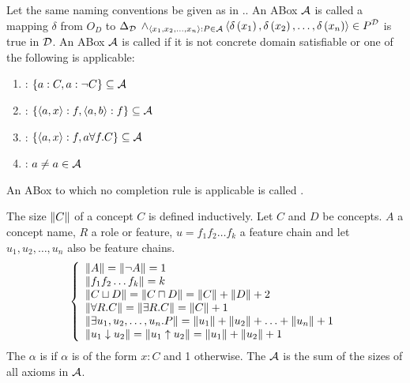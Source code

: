 \begin{defi}
Let the same naming conventions be given as in .. An ABox $\mathcal{A}$ is called  \iffTx{} \teTx{} a mapping $\delta$ from $O_D$ to $\Delta_{\mathcal{D}}$ \stTx{} $\displaystyle\wedge_{\left\langle x_1,x_2,\ldots,x_n\right\rangle:P\in\mathcal{A}}\left\langle \delta\left(x_1\right),\delta\left(x_2\right),\ldots,\delta\left(x_n\right)\right\rangle\in P^{\mathcal{D}}$ is true in $\mathcal{D}$. An ABox $\mathcal{A}$ is called  if it is not concrete domain satisfiable or one of the following  is applicable:
\begin{enumerate}
 \item {}: $\left\{ a:C,a:\neg C\right\}\subseteq\mathcal{A}$
 \item {}: $\left\{ \left\langle a,x\right\rangle:f,\left\langle a,b\right\rangle:f\right\}\subseteq\mathcal{A}$
 \item {}: $\left\{ \left\langle a,x\right\rangle:f,a\forall f.C\right\}\subseteq\mathcal{A}$
 \item {}: $a\neq a\in\mathcal{A}$
\end{enumerate}
An ABox to which no completion rule is applicable is called .
\cite{conf/ijcai/Lutz99}
\end{defi}

\begin{defi}
The size $\left\|C\right\|$ of a concept $C$ is defined inductively. Let $C$ and $D$ be concepts. $A$ a concept name, $R$ a role or feature, $u=f_1f_2\ldots f_k$ a feature chain and let $u_1,u_2,\ldots,u_n$ also be feature chains.
\begin{equation}
\left\{\begin{array}{l}\left\|A\right\|=\left\|\neg A\right\|=1\\
\left\|f_1f_2\ldots f_k\right\|=k\\
\left\|C\sqcup D\right\|=\left\|C\sqcap D\right\|=\left\|C\right\|+\left\|D\right\|+2\\
\left\|\forall R.C\right\|=\left\|\exists R.C\right\|=\left\|C\right\|+1\\
\left\|\exists u_1,u_2,\ldots,u_n.P\right\|=\left\|u_1\right\|+\left\|u_2\right\|+\ldots+\left\|u_n\right\|+1\\
\left\|u_1\downarrow u_2\right\|=\left\|u_1\uparrow u_2\right\|=\left\|u_1\right\|+\left\|u_2\right\|+1\end{array}\right.
\end{equation}
The  $\alpha$ is  if $\alpha$ is of the form $x:C$ and 1 otherwise. The  $\mathcal{A}$ is the sum of the sizes of all axioms in $\mathcal{A}$.
\cite{conf/ijcai/Lutz99}
\end{defi}

